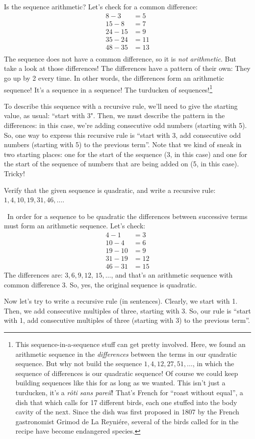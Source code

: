 Is the sequence arithmetic? Let's check for a common difference:
\[\begin{aligned}
8-3 &=5\\
15-8 &=7\\
24-15 &=9\\
35-24 &=11\\
48-35 &=13\\
\end{aligned}\]
The sequence does not have a common difference, so it is \textit{not arithmetic}. But take a look at those differences! The differences have a pattern of their own: They go up by 2 every time. In other words, the differences form an arithmetic sequence! It's a sequence in a sequence! The turducken of sequences!\footnote{This sequence-in-a-sequence stuff can get pretty involved. Here, we found an arithmetic sequence in the \textit{differences} between the terms in our quadratic sequence. But why not build the sequence $1, 4, 12, 27, 51, \dotsc$, in which the sequence of differences is our quadratic sequence! Of course we could keep building sequences like this for as long as we wanted. This isn't just a turducken, it's a \textit{r\^oti sans pareil}! That's French for ``roast without equal'', a dish that which calls for 17 different birds, each one stuffed into the body cavity of the next. Since the dish was first proposed in 1807 by the French gastronomist Grimod de La Reyni\'ere, several of the birds called for in the recipe have become endangered species.}

To describe this sequence with a recursive rule, we'll need to give the starting value, as usual: ``start with 3". Then, we must describe the pattern in the differences: in this case, we're adding consecutive odd numbers (starting with 5). So, one way to express this recursive rule is ``start with 3, add consecutive odd numbers (starting with 5) to the previous term''. Note that we kind of sneak in two starting places: one for the start of the sequence (3, in this case) and one for the start of the sequence of numbers that are being added on (5, in this case). Tricky!

\begin{boxedex}
Verify that the given sequence is quadratic, and write a recursive rule: $1, 4, 10, 19, 31, 46, \dotsc$.

\exsoln\ In order for a sequence to be quadratic the differences between successive terms must form an arithmetic sequence. Let's check:
\[\begin{aligned}
4-1 &= 3\\
10-4 &= 6\\
19-10 &= 9\\
31-19 &= 12\\
46-31 &= 15
\end{aligned}\]
The differences are: $3, 6, 9, 12,\,15, \dotsc$, and that's an arithmetic sequence with common difference 3. So, yes, the original sequence is quadratic.

Now let's try to write a recursive rule (in sentences). Clearly, we start with 1. Then, we add consecutive multiples of three, starting with 3. So, our rule is ``start with 1, add consecutive multiples of three (starting with 3) to the previous term''.
\end{boxedex}


